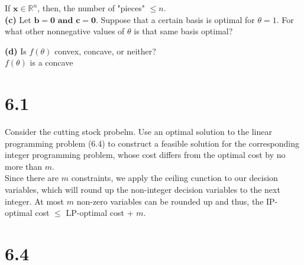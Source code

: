 \documentclass{article}
\begin{document}
\noindent
If $\mathbf{x} \in \mathbb{R}^n$, then, the number of "pieces" $\leq n$. \\


\noindent
\textbf{(c)}  Let $\mathbf{b = 0 \text{ and } c = 0}$.  Suppose that a certain basis is optimal for $\theta = 1$.  For what other nonnegative values of $\theta$ is that same basis optimal? \\

\noindent



\noindent
\textbf{(d)} Is $f(\theta)$ convex, concave, or neither? \\

\noindent
$f(\theta)$ is a concave 

\section*{6.1}
Consider the cutting stock probelm.  Use an optimal solution to the linear programming problem (6.4) to construct a feasible solution for the corresponding integer programming problem, whose cost differs from the optimal cost by no more than $m$.  \\

\noindent
Since there are $m$ constraints, we apply the ceiling cunction to our decision variables, which will round up the non-integer decision variables to the next integer.  At most $m$ non-zero variables can be rounded up and thus, the IP-optimal cost $\leq$ LP-optimal cost + $m$. \\

\section*{6.4}

\noindent
\end{document}

